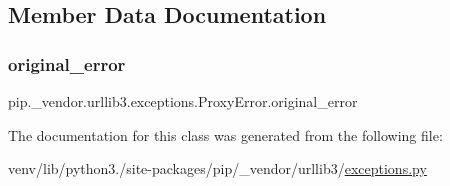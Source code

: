 \subsection{Member Data Documentation}
\mbox{\label{classpip_1_1__vendor_1_1urllib3_1_1exceptions_1_1ProxyError_a2e6b1531c9a7276926436c893f8bec58}} 
\subsubsection{\texorpdfstring{original\+\_\+error}{original\_error}}
{\footnotesize\ttfamily pip.\+\_\+vendor.\+urllib3.\+exceptions.\+Proxy\+Error.\+original\+\_\+error}



The documentation for this class was generated from the following file\+:\begin{DoxyCompactItemize}
\item 
venv/lib/python3./site-\/packages/pip/\+\_\+vendor/urllib3/\hyperlink{pip_2__vendor_2urllib3_2exceptions_8py}{exceptions.\+py}\end{DoxyCompactItemize}
